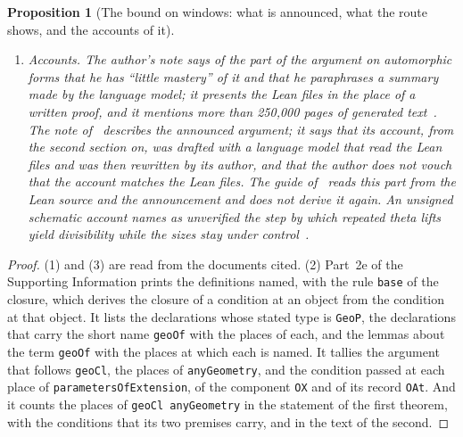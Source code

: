 \documentclass[11pt]{article}
\newtheorem{proposition}[theorem]{Proposition}
\theoremstyle{definition}
\theoremstyle{remark}
\DeclareRobustCommand{\lean}[1]{{\renewcommand{\_}{\textunderscore\allowbreak}\texttt{#1}}}
\begin{document}
\begin{proposition}[The bound on windows: what is announced, what the route shows, and the accounts of it]
\begin{enumerate}[leftmargin=2em,itemsep=1pt]
\item \emph{Accounts.} The author's note says of the part of the argument on automorphic forms that he has ``little mastery'' of it and that he paraphrases a summary made by the language model; it presents the Lean files in the place of a written proof, and it mentions more than 250{,}000 pages of generated text~\citep{alpoge}. The note of~\citet{zhang} describes the announced argument; it says that its account, from the second section on, was drafted with a language model that read the Lean files and was then rewritten by its author, and that the author does not vouch that the account matches the Lean files. The guide of~\citet{riemannrev} reads this part from the Lean source and the announcement and does not derive it again. An unsigned schematic account names as unverified the step by which repeated theta lifts yield divisibility while the sizes stay under control~\citep{schematic}.
\end{enumerate}
\end{proposition}

\begin{proof}
(1) and (3) are read from the documents cited. (2) Part~2e of the Supporting Information prints the definitions named, with the rule \lean{base} of the closure, which derives the closure of a condition at an object from the condition at that object. It lists the declarations whose stated type is \lean{GeoP}, the declarations that carry the short name \lean{geoOf} with the places of each, and the lemmas about the term \lean{geoOf} with the places at which each is named. It tallies the argument that follows \lean{geoCl}, the places of \lean{anyGeometry}, and the condition passed at each place of \lean{parametersOfExtension}, of the component \lean{OX} and of its record \lean{OAt}. And it counts the places of \lean{geoCl anyGeometry} in the statement of the first theorem, with the conditions that its two premises carry, and in the text of the second.
\end{proof}
\end{document}
